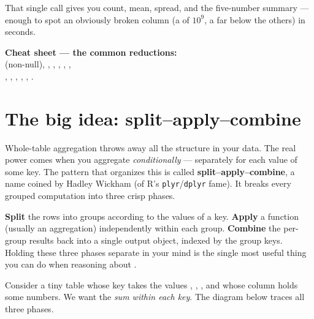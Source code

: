 \documentclass[11pt]{article}
\begin{document}
That single call gives you count, mean, spread, and the five-number summary --- enough to spot an obviously broken column (a  of $10^9$, a  far below the others) in seconds.

\begin{outbox}
\textbf{Cheat sheet --- the common reductions:} \\[2pt]
 (non-null), , , , , , \\
, , , , , .
\end{outbox}

\section{The big idea: split--apply--combine}

Whole-table aggregation throws away all the structure in your data. The real power comes when you aggregate \emph{conditionally} --- separately for each value of some key. The pattern that organizes this is called \textbf{split--apply--combine}, a name coined by Hadley Wickham (of R's \texttt{plyr}/\texttt{dplyr} fame). It breaks every grouped computation into three crisp phases.

\begin{keyidea}
\textbf{Split} the rows into groups according to the values of a key. \textbf{Apply} a function (usually an aggregation) independently within each group. \textbf{Combine} the per-group results back into a single output object, indexed by the group keys. Holding these three phases separate in your mind is the single most useful thing you can do when reasoning about .
\end{keyidea}

Consider a tiny table whose key takes the values , , , and whose  column holds some numbers. We want the \emph{sum within each key}. The diagram below traces all three phases.
\end{document}

